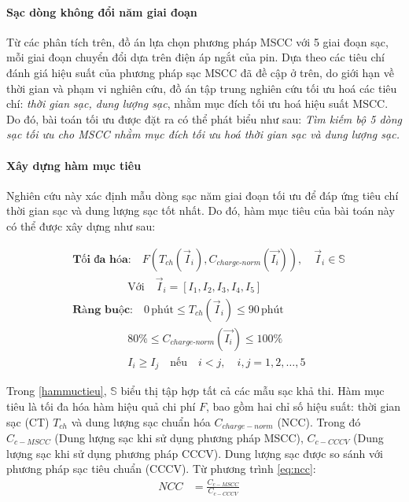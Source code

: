 \documentclass{thesis}
\begin{document}
\paragraph{Sạc dòng không đổi năm giai đoạn}\mbox


Từ các phân tích trên, đồ án lựa chọn phương pháp MSCC với 5 giai đoạn sạc, mỗi giai đoạn chuyển đổi dựa trên điện áp ngắt của pin. Dựa theo các tiêu chí đánh giá hiệu suất của phương pháp sạc MSCC đã đề cập ở trên, do giới hạn về thời gian và phạm vi nghiên cứu, đồ án tập trung nghiên cứu tối ưu hoá các tiêu chí: \textit{thời gian sạc, dung lượng sạc}, nhằm mục đích tối ưu hoá hiệu suất MSCC. 
Do đó, bài toán tối ưu được đặt ra có thể phát biểu như sau: \textit{Tìm kiếm bộ 5 dòng sạc tối ưu cho MSCC nhằm mục đích tối ưu hoá thời gian sạc và dung lượng sạc.}
 
\paragraph{Xây dựng hàm mục tiêu}\mbox


Nghiên cứu này xác định mẫu dòng sạc năm giai đoạn tối ưu để đáp ứng tiêu chí thời gian sạc và dung lượng sạc tốt nhất. Do đó, hàm mục tiêu của bài toán này có thể được xây dựng như sau:

\begin{equation}
\begin{aligned}
&\textbf{Tối đa hóa:} \quad F\left(T_{ch}(\vec{I}_{i}), C_{charge\text{-}norm}(\vec{I_{i}})\right), \quad \vec{I}_{i} \in \mathbb{S} \\
&\qquad\qquad\quad\text{Với} \quad \vec{I}_{i} = \left[I_{1}, I_{2}, I_{3}, I_{4}, I_{5}\right] \\
&\textbf{Ràng buộc:} \quad 0\, \text{phút} \leq T_{ch}\left(\vec{I}_{i}\right) \leq 90\, \text{phút} \\
&\qquad \qquad \quad 80\% \leq  C_{charge\text{-}norm}\left(\vec{I_{i}}\right) \leq 100\% \\
&\qquad \qquad \quad I_{i} \geq I_{j} \quad \text{nếu} \quad i < j, \quad i, j = 1, 2, \ldots, 5
\end{aligned}
\label{hammuctieu}
\end{equation}

Trong \ref{hammuctieu}, \(\mathbb{S}\) biểu thị tập hợp tất cả các mẫu sạc khả thi. Hàm mục tiêu là tối đa hóa hàm hiệu quả chi phí \(F\), bao gồm hai chỉ số hiệu suất: thời gian sạc (CT) \(T_{ch}\) và dung lượng sạc chuẩn hóa \(C_{charge-norm}\) (NCC). Trong đó $C_{c-MSCC}$ (Dung lượng sạc khi sử dụng phương pháp MSCC), $C_{c-CCCV}$ (Dung lượng sạc khi sử dụng phương pháp CCCV). Dung lượng sạc được so sánh với phương pháp sạc tiêu chuẩn (CCCV). Từ phương trình \ref{eq:ncc}:
\begin{align}
NCC &= \frac{C_{c-MSCC}}{C_{c-CCCV}} \quad 
\label{eq:ncc}
\end{align}
\end{document}
